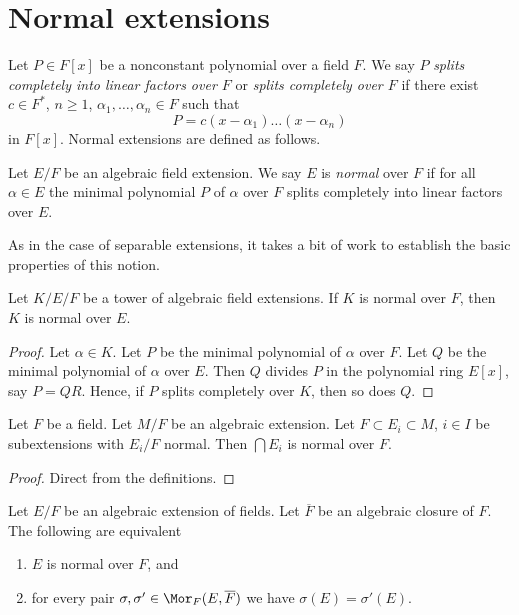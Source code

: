 \section{Normal extensions}
\label{section-normal}

\noindent
Let $P \in F[x]$ be a nonconstant polynomial over a field $F$. We say $P$
{\it splits completely into linear factors over $F$} or
{\it splits completely over $F$} if there exist
$c \in F^*$, $n \geq 1$, $\alpha_1, \ldots, \alpha_n \in F$ such that
$$
P = c(x - \alpha_1) \ldots (x - \alpha_n)
$$
in $F[x]$. Normal extensions are defined as follows.

\begin{definition}
\label{definition-normal}
Let $E/F$ be an algebraic field extension. We say $E$ is {\it normal}
over $F$ if for all $\alpha \in E$ the minimal polynomial $P$
of $\alpha$ over $F$ splits completely into linear factors over $E$.
\end{definition}

\noindent
As in the case of separable extensions, it takes a bit of work to establish
the basic properties of this notion.

\begin{lemma}
\label{lemma-normal-goes-up}
Let $K/E/F$ be a tower of algebraic field extensions.
If $K$ is normal over $F$, then $K$ is normal over $E$.
\end{lemma}

\begin{proof}
Let $\alpha \in K$. Let $P$ be the minimal polynomial of $\alpha$ over $F$.
Let $Q$ be the minimal polynomial of $\alpha$ over $E$.
Then $Q$ divides $P$ in the polynomial ring $E[x]$, say $P = QR$.
Hence, if $P$ splits completely over $K$, then so does $Q$.
\end{proof}

\begin{lemma}
\label{lemma-intersect-normal}
Let $F$ be a field. Let $M/F$ be an algebraic extension. Let
$F \subset E_i \subset M$, $i \in I$ be subextensions with
$E_i/F$ normal. Then $\bigcap E_i$ is normal over $F$.
\end{lemma}

\begin{proof}
Direct from the definitions.
\end{proof}

\begin{lemma}
\label{lemma-characterize-normal}
Let $E/F$ be an algebraic extension of fields. Let $\overline{F}$ be an
algebraic closure of $F$. The following are equivalent
\begin{enumerate}
\item $E$ is normal over $F$, and
\item for every pair $\sigma, \sigma' \in \Mor_F(E, \overline{F})$ we
have $\sigma(E) = \sigma'(E)$.
\end{enumerate}
\end{lemma}

